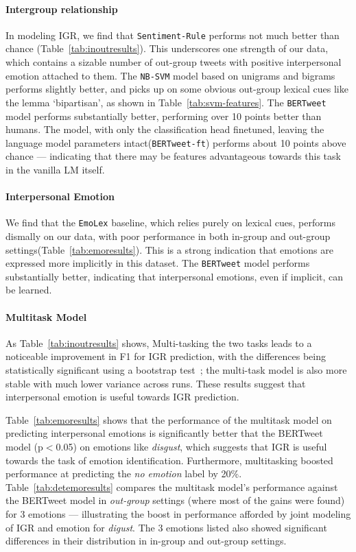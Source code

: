 \paragraph{Intergroup relationship} In modeling IGR, we find that \texttt{Sentiment-Rule} performs not much better than chance (Table~\ref{tab:inoutresults}). This underscores one strength of our data, which contains a sizable number of out-group tweets with positive interpersonal emotion attached to them. The \texttt{NB-SVM} model based on unigrams and bigrams performs slightly better, and picks up on some obvious out-group lexical cues like the lemma `bipartisan', as shown in Table~\ref{tab:svm-features}. The \texttt{BERTweet} model performs substantially better, performing over 10 points better than humans. The model, with only the classification head finetuned, leaving the language model parameters intact(\texttt{BERTweet-ft}) performs about 10 points above chance --- indicating that there may be features advantageous towards this task in the vanilla LM itself.

\paragraph{Interpersonal Emotion}

We find that the \texttt{EmoLex} baseline, which relies purely on lexical cues, performs dismally on our data, with poor performance in both in-group and out-group settings(Table~\ref{tab:emoresults}). This is a strong indication that emotions are expressed more implicitly in this dataset. The \texttt{BERTweet} model performs substantially better, indicating that interpersonal emotions, even if implicit, can be learned.

\paragraph{Multitask Model}

As Table~\ref{tab:inoutresults} shows, Multi-tasking the two tasks leads to a noticeable improvement in F1 for IGR prediction, with the differences being statistically significant using a bootstrap test~\cite[p$<$0.05;][]{berg-kirkpatrick-etal-2012-empirical}; the multi-task model is also more stable with much lower variance across runs. These results suggest that interpersonal emotion is useful towards IGR prediction.

Table~\ref{tab:emoresults} shows that the performance of the multitask model on predicting interpersonal emotions is significantly better that the BERTweet model (p$<$0.05) on emotions like \emph{disgust}, which suggests that IGR is useful towards the task of emotion identification. Furthermore, multitasking boosted performance at predicting the \emph{no emotion} label by 20\%.  Table~\ref{tab:detemoresults} compares the multitask model's performance against the BERTweet model in \emph{out-group} settings (where most of the gains were found) for 3 emotions --- illustrating the boost in performance afforded by joint modeling of IGR and emotion for \emph{digust}. The 3 emotions listed also showed significant differences in their distribution in in-group and out-group settings.

